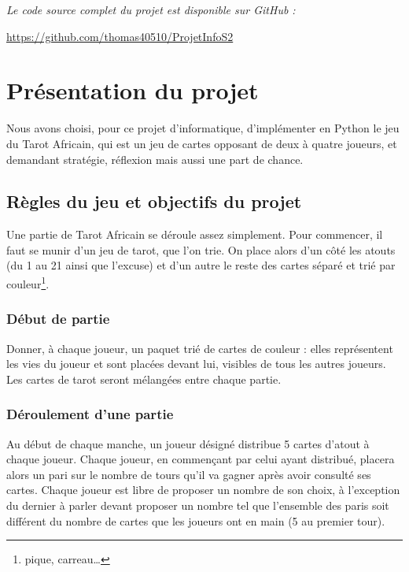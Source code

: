 \noindent\textit{Le code source complet du projet est disponible sur GitHub :}

\begin{center}
   {\color{blue}\url{https://github.com/thomas40510/ProjetInfoS2}}
\end{center}

\hrulefill


\section{Présentation du projet}\label{sec:présentation-du-projet}
   Nous avons choisi, pour ce projet d'informatique, d'implémenter en Python le jeu du Tarot Africain, qui est un jeu de cartes opposant de deux à quatre joueurs, et demandant stratégie, réflexion mais aussi une part de chance.

   \subsection{Règles du jeu et objectifs du projet}\label{subsec:règles-du-jeu-et-objectifs-du-projet}
      Une partie de Tarot Africain se déroule assez simplement.
      Pour commencer, il faut se munir d'un jeu de tarot, que l'on trie.
      On place alors d'un côté les atouts (du 1 au 21 ainsi que l'excuse) et d'un autre le reste des cartes séparé et trié par couleur\footnote{pique, carreau\dots}.
      \subsubsection{Début de partie}
         Donner, à chaque joueur, un paquet trié de cartes de couleur : elles représentent les vies du joueur et sont placées devant lui, visibles de tous les autres joueurs.
         Les cartes de tarot seront mélangées entre chaque partie.
      \subsubsection{Déroulement d'une partie}
         Au début de chaque manche, un joueur désigné distribue 5 cartes d'atout à chaque joueur.
         Chaque joueur, en commençant par celui ayant distribué, placera alors un pari sur le nombre de tours qu'il va gagner après avoir consulté ses cartes.
         Chaque joueur est libre de proposer un nombre de son choix, à l'exception du dernier à parler devant proposer un nombre tel que l'ensemble des paris soit différent du nombre de cartes que les joueurs ont en main (5 au premier tour).

